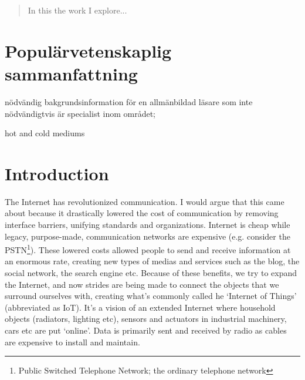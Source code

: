 \documentclass[final,a4paper,twoside,11pt,onecolumn]{report}
\begin{document}
\maketitle

% 
% 

\begin{abstract}
In this the work I explore...
\end{abstract}

\setcounter{tocdepth}{4}
\tableofcontents

\printacronyms[include-classes=abbrev,name=Abbreviations]

\chapter{Populärvetenskaplig sammanfattning}
nödvändig bakgrundsinformation för en allmänbildad läsare som inte nödvändigtvis är specialist inom området;

hot and cold mediums

\chapter{Introduction}
\label{cha:intro}
The Internet has revolutionized communication. I would argue that this came about because it drastically lowered the cost of communication by removing interface barriers, unifying standards and organizations. Internet is cheap while legacy, purpose-made, communication networks are expensive (e.g. consider the PSTN\footnote{Public Switched Telephone Network; the ordinary telephone network}). These lowered costs allowed people to send and receive information at an enormous rate, creating new types of medias and services such as the blog, the social network, the search engine etc. Because of these benefits, we try to expand the Internet, and now strides are being made to connect the objects that we surround ourselves with, creating what's commonly called he `Internet of Things' (abbreviated as IoT). It's a vision of an extended Internet where household objects (radiators, lighting etc), sensors and actuators in industrial machinery, cars etc are put `online'. Data is primarily sent and received by radio as cables are expensive to install and maintain.
\end{document}
